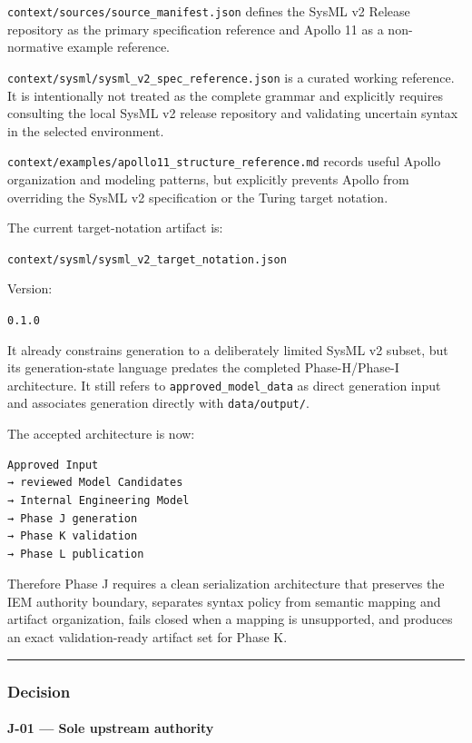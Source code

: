 \texttt{context/sources/source\_manifest.json} defines the SysML v2 Release repository as the primary specification reference and Apollo 11 as a non-normative example reference.

\texttt{context/sysml/sysml\_v2\_spec\_reference.json} is a curated working reference. It is intentionally not treated as the complete grammar and explicitly requires consulting the local SysML v2 release repository and validating uncertain syntax in the selected environment.

\texttt{context/examples/apollo11\_structure\_reference.md} records useful Apollo organization and modeling patterns, but explicitly prevents Apollo from overriding the SysML v2 specification or the Turing target notation.

The current target-notation artifact is:

\texttt{context/sysml/sysml\_v2\_target\_notation.json}

Version:

\texttt{0.1.0}

It already constrains generation to a deliberately limited SysML v2 subset, but its generation-state language predates the completed Phase-H/Phase-I architecture. It still refers to \texttt{approved\_model\_data} as direct generation input and associates generation directly with \texttt{data/output/}.

The accepted architecture is now:

\begin{verbatim}
Approved Input
→ reviewed Model Candidates
→ Internal Engineering Model
→ Phase J generation
→ Phase K validation
→ Phase L publication
\end{verbatim}

Therefore Phase J requires a clean serialization architecture that preserves the IEM authority boundary, separates syntax policy from semantic mapping and artifact organization, fails closed when a mapping is unsupported, and produces an exact validation-ready artifact set for Phase K.

\begin{center}\rule{0.5\linewidth}{0.5pt}\end{center}

\hypertarget{decision-6}{%
\subsubsection{Decision}\label{decision-6}}

\hypertarget{j-01--sole-upstream-authority}{%
\paragraph{J-01 --- Sole upstream authority}\label{j-01--sole-upstream-authority}}

